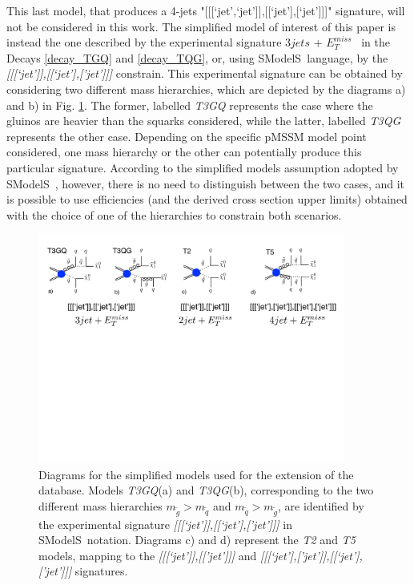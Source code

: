 \documentclass[a4paper,10pt]{article}
\newcommand{\SMO}{{\sc SModelS}}
\newcommand{\MET}{{ $E_T ^{miss}$}}
\begin{document}
This last model, that produces a 4-jets "[[[`jet',`jet']],[[`jet'],[`jet']]]" signature, will not be considered in this work. The simplified model of interest of this paper is instead the one described by the experimental signature $3jets$ + \MET~ in the Decays \ref{decay_TGQ} and \ref{decay_TQG}, or, using \SMO~language, by the \textit{[[[`jet']],[[`jet'],['jet']]]} constrain. This experimental signature can be obtained by considering two different mass hierarchies, which are depicted by the diagrams a) and b) in Fig. \ref{Diagrams}. The former, labelled \textit{T3GQ} represents the case where the gluinos are heavier than the squarks considered, while the latter, labelled \textit{T3QG} represents the other case. Depending on the specific pMSSM model point considered, one mass hierarchy or the other can potentially produce this particular signature. According to the simplified models assumption adopted by \SMO~, however, there is no need to distinguish between the two cases, and it is possible to use efficiencies (and the derived cross section upper limits) obtained with the choice of one of the hierarchies to constrain both scenarios. 
\begin{figure}
\begin{center}
\includegraphics[width=0.9\textwidth]{PLOTS/Diagrams_2}
\end{center}
\caption{Diagrams for the simplified models used for the extension of the database. Models \textit{T3GQ}(a) and \textit{T3QG}(b), corresponding to the two different mass hierarchies $m_{\tilde g} > m_{\tilde q}$ and $m_{\tilde q} > m_{\tilde g}$, are identified by the experimental signature \textit{[[[`jet']],[[`jet'],['jet']]]} in \SMO~notation. Diagrams c) and d) represent the \textit{T2} and \textit{T5} models, mapping to the \textit{[[[`jet']],[['jet']]]} and \textit{[[[`jet'],['jet']],[[`jet'],['jet']]]} signatures.}
\label{Diagrams}
\end{figure}
\end{document}
